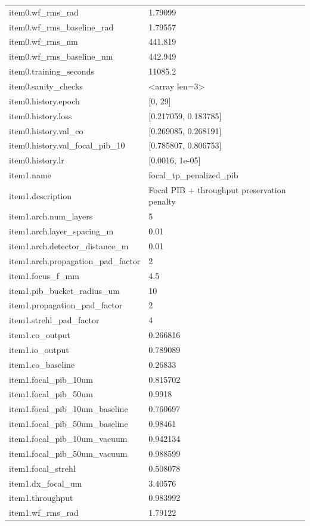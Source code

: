 \begin{longtable}{p{}p{}}
item0.wf\_rms\_rad & 1.79099\\
item0.wf\_rms\_baseline\_rad & 1.79557\\
item0.wf\_rms\_nm & 441.819\\
item0.wf\_rms\_baseline\_nm & 442.949\\
item0.training\_seconds & 11085.2\\
item0.sanity\_checks & <array len=3>\\
item0.history.epoch & [0, 29]\\
item0.history.loss & [0.217059, 0.183785]\\
item0.history.val\_co & [0.269085, 0.268191]\\
item0.history.val\_focal\_pib\_10 & [0.785807, 0.806753]\\
item0.history.lr & [0.0016, 1e-05]\\
item1.name & focal\_tp\_penalized\_pib\\
item1.description & Focal PIB + throughput preservation penalty\\
item1.arch.num\_layers & 5\\
item1.arch.layer\_spacing\_m & 0.01\\
item1.arch.detector\_distance\_m & 0.01\\
item1.arch.propagation\_pad\_factor & 2\\
item1.focus\_f\_mm & 4.5\\
item1.pib\_bucket\_radius\_um & 10\\
item1.propagation\_pad\_factor & 2\\
item1.strehl\_pad\_factor & 4\\
item1.co\_output & 0.266816\\
item1.io\_output & 0.789089\\
item1.co\_baseline & 0.26833\\
item1.focal\_pib\_10um & 0.815702\\
item1.focal\_pib\_50um & 0.9918\\
item1.focal\_pib\_10um\_baseline & 0.760697\\
item1.focal\_pib\_50um\_baseline & 0.98461\\
item1.focal\_pib\_10um\_vacuum & 0.942134\\
item1.focal\_pib\_50um\_vacuum & 0.988599\\
item1.focal\_strehl & 0.508078\\
item1.dx\_focal\_um & 3.40576\\
item1.throughput & 0.983992\\
item1.wf\_rms\_rad & 1.79122\\

\end{longtable}

